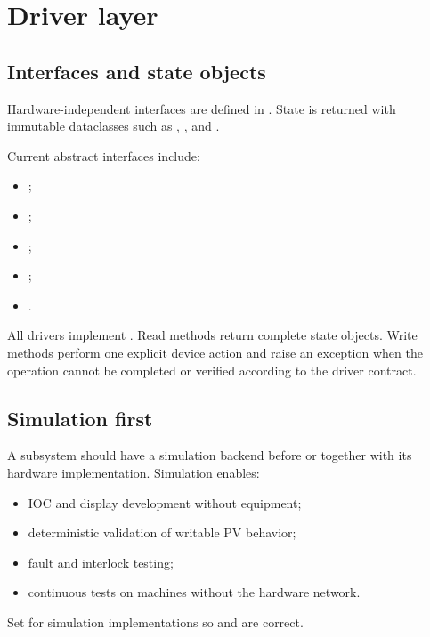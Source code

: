 \section{Driver layer}

\subsection{Interfaces and state objects}

Hardware-independent interfaces are defined in . State is returned with immutable dataclasses such as , , and .

Current abstract interfaces include:

\begin{itemize}
  \item {};
  \item {};
  \item {};
  \item {};
  \item {}.
\end{itemize}

All drivers implement . Read methods return complete state objects. Write methods perform one explicit device action and raise an exception when the operation cannot be completed or verified according to the driver contract.

\subsection{Simulation first}

A subsystem should have a simulation backend before or together with its hardware implementation. Simulation enables:

\begin{itemize}
  \item IOC and display development without equipment;
  \item deterministic validation of writable PV behavior;
  \item fault and interlock testing;
  \item continuous tests on machines without the hardware network.
\end{itemize}

Set  for simulation implementations so  and  are correct.

